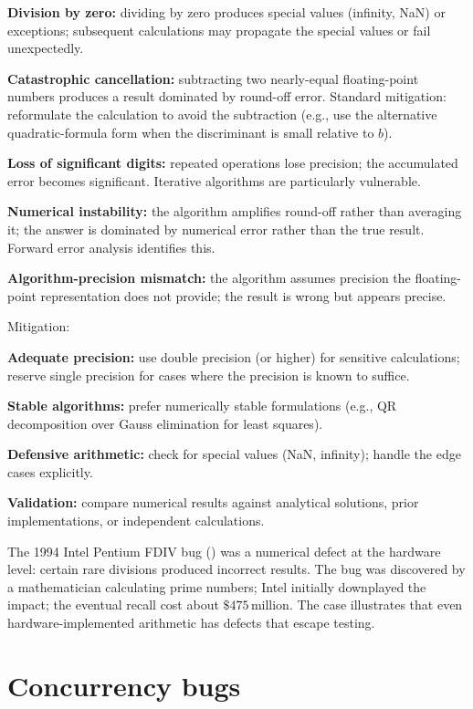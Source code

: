 \textbf{Division by zero:} dividing by zero produces special values (infinity, NaN) or exceptions; subsequent calculations may propagate the special values or fail unexpectedly.

\textbf{Catastrophic cancellation:} subtracting two nearly-equal floating-point numbers produces a result dominated by round-off error. Standard mitigation: reformulate the calculation to avoid the subtraction (e.g., use the alternative quadratic-formula form when the discriminant is small relative to $b$).

\textbf{Loss of significant digits:} repeated operations lose precision; the accumulated error becomes significant. Iterative algorithms are particularly vulnerable.

\textbf{Numerical instability:} the algorithm amplifies round-off rather than averaging it; the answer is dominated by numerical error rather than the true result. Forward error analysis identifies this.

\textbf{Algorithm-precision mismatch:} the algorithm assumes precision the floating-point representation does not provide; the result is wrong but appears precise.

Mitigation:

\textbf{Adequate precision:} use double precision (or higher) for sensitive calculations; reserve single precision for cases where the precision is known to suffice.

\textbf{Stable algorithms:} prefer numerically stable formulations (e.g., QR decomposition over Gauss elimination for least squares).

\textbf{Defensive arithmetic:} check for special values (NaN, infinity); handle the edge cases explicitly.

\textbf{Validation:} compare numerical results against analytical solutions, prior implementations, or independent calculations.

The 1994 Intel Pentium FDIV bug (\cite{paper:coe-tang-pratt-1995}) was a numerical defect at the hardware level: certain rare divisions produced incorrect results. The bug was discovered by a mathematician calculating prime numbers; Intel initially downplayed the impact; the eventual recall cost about $\$475\,\text{million}$. The case illustrates that even hardware-implemented arithmetic has defects that escape testing.

\section{Concurrency bugs}


